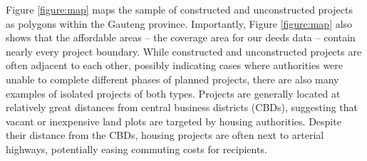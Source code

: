\documentclass[12pt]{article}
\begin{document}
Figure \ref{figure:map} maps the sample of constructed and unconstructed projects as polygons within the Gauteng province. Importantly, Figure \ref{figure:map} also shows that the affordable areas -- the coverage area for our deeds data -- contain nearly every project boundary. While constructed and unconstructed projects are often adjacent to each other, possibly indicating cases where authorities were unable to complete different phases of planned projects, there are also many examples of isolated projects of both types.  Projects are generally located at relatively great distances from central business districts (CBDs), suggesting that vacant or inexpensive land plots are targeted by housing authorities.  Despite their distance from the CBDs, housing projects are often next to arterial highways, potentially easing commuting costs for recipients.






\end{document}
